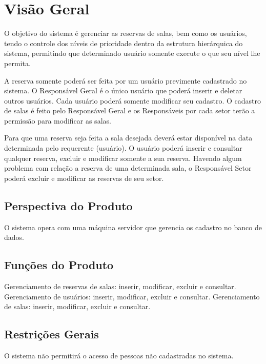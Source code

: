 \chapter{Vis\~ao Geral}
	O objetivo do sistema é gerenciar as reservas de salas, bem como os usu\'arios, tendo o controle dos n\'iveis de prioridade dentro da estrutura hier\'arquica do sistema, permitindo que determinado usu\'ario somente execute o que seu n\'ivel lhe permita. %
	
	A reserva somente poder\'a ser feita por um usu\'ario previmente cadastrado no sistema. O Respons\'avel Geral \'e o único usuário que poderá inserir e deletar outros usuários. Cada usuário poderá somente modificar seu cadastro.
	O cadastro de salas \'e feito pelo Responsável Geral e os Responsáveis por cada setor terão a permissão para modificar as salas.
	
	Para que uma reserva seja feita a sala desejada deverá estar disponível na data determinada pelo requerente (usuário). O usuário poderá inserir e consultar qualquer reserva, excluir e modificar somente a sua reserva. Havendo algum problema com relação a reserva de uma determinada sala, o Responsável Setor poderá excluir e modificar as reservas de seu setor.
	
	
\section{Perspectiva do Produto}
	O sistema opera com uma m\'aquina servidor que gerencia os cadastro no banco de dados.
	
\section{Funç\~oes do Produto}
	Gerenciamento de reservas de salas: inserir, modificar, excluir e consultar.
	Gerenciamento de usu\'arios: inserir, modificar, excluir e consultar.
	Gerenciamento de salas: inserir, modificar, excluir e consultar.
	
\section{Restriç\~oes Gerais}
	O sistema n\~ao permitir\'a o acesso de pessoas n\~ao cadastradas no sistema.
	